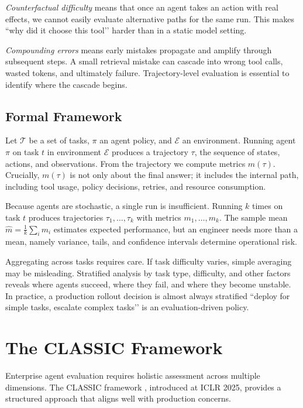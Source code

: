 \textit{Counterfactual difficulty} means that once an agent takes an action with real effects, we cannot easily evaluate alternative paths for the same run. This makes ``why did it choose this tool’’ harder than in a static model setting.

\textit{Compounding errors} means early mistakes propagate and amplify through subsequent steps. A small retrieval mistake can cascade into wrong tool calls, wasted tokens, and ultimately failure. Trajectory-level evaluation is essential to identify where the cascade begins.

\subsection{Formal Framework}

Let $\mathcal{T}$ be a set of tasks, $\pi$ an agent policy, and $\mathcal{E}$ an environment. Running agent $\pi$ on task $t$ in environment $\mathcal{E}$ produces a trajectory $\tau$, the sequence of states, actions, and observations. From the trajectory we compute metrics $m(\tau)$. Crucially, $m(\tau)$ is not only about the final answer; it includes the internal path, including tool usage, policy decisions, retries, and resource consumption.

Because agents are stochastic, a single run is insufficient. Running $k$ times on task $t$ produces trajectories $\tau_1, \ldots, \tau_k$ with metrics $m_1, \ldots, m_k$. The sample mean $\hat{m} = \frac{1}{k}\sum_i m_i$ estimates expected performance, but an engineer needs more than a mean, namely variance, tails, and confidence intervals determine operational risk.

Aggregating across tasks requires care. If task difficulty varies, simple averaging may be misleading. Stratified analysis by task type, difficulty, and other factors reveals where agents succeed, where they fail, and where they become unstable. In practice, a production rollout decision is almost always stratified ``deploy for simple tasks, escalate complex tasks’’ is an evaluation-driven policy.

\section{The CLASSIC Framework}

Enterprise agent evaluation requires holistic assessment across multiple dimensions. The CLASSIC framework \cite{classic2025}, introduced at ICLR 2025, provides a structured approach that aligns well with production concerns.

